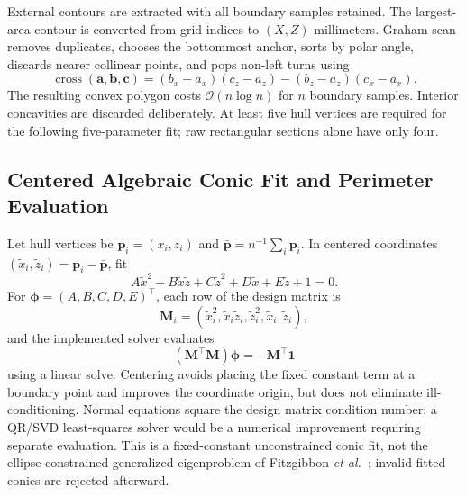 \documentclass[journal]{IEEEtran}
\begin{document}
External contours are extracted with all boundary samples retained. The largest-area contour is converted from grid indices to $(X,Z)$ millimeters. Graham scan removes duplicates, chooses the bottommost anchor, sorts by polar angle, discards nearer collinear points, and pops non-left turns using
\begin{equation}
\operatorname{cross}(\mathbf a,\mathbf b,\mathbf c)
=(b_x-a_x)(c_z-a_z)-(b_z-a_z)(c_x-a_x).
\end{equation}
The resulting convex polygon costs $\mathcal O(n\log n)$ for $n$ boundary samples. Interior concavities are discarded deliberately. At least five hull vertices are required for the following five-parameter fit; raw rectangular sections alone have only four.

\subsection{Centered Algebraic Conic Fit and Perimeter Evaluation}
Let hull vertices be $\mathbf p_i=(x_i,z_i)$ and $\bar{\mathbf p}=n^{-1}\sum_i\mathbf p_i$. In centered coordinates $(\tilde x_i,\tilde z_i)=\mathbf p_i-\bar{\mathbf p}$, fit
\begin{equation}
A\tilde x^2+B\tilde x\tilde z+C\tilde z^2+D\tilde x+E\tilde z+1=0.
\end{equation}
For $\boldsymbol\phi=(A,B,C,D,E)^\top$, each row of the design matrix is
\begin{equation}
\mathbf M_i=(\tilde x_i^2,\tilde x_i\tilde z_i,\tilde z_i^2,\tilde x_i,\tilde z_i),
\end{equation}
and the implemented solver evaluates
\begin{equation}
(\mathbf M^\top\mathbf M)\boldsymbol\phi=-\mathbf M^\top\mathbf 1
\label{eq:conic_normal_equations}
\end{equation}
using a linear solve. Centering avoids placing the fixed constant term at a boundary point and improves the coordinate origin, but does not eliminate ill-conditioning. Normal equations square the design matrix condition number; a QR/SVD least-squares solver would be a numerical improvement requiring separate evaluation. This is a fixed-constant unconstrained conic fit, not the ellipse-constrained generalized eigenproblem of Fitzgibbon \emph{et al.}~\cite{fitzgibbon1999direct}; invalid fitted conics are rejected afterward.
\end{document}
